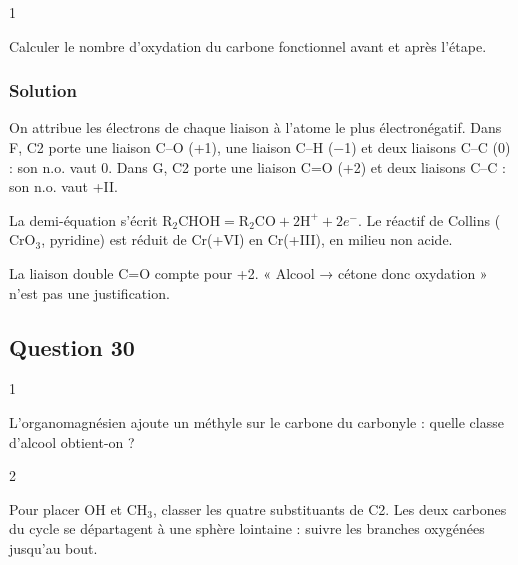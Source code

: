 \documentclass[11pt,a4paper]{article}
\newcommand{\equationajustee}[1]{%
  \sbox{\boiteequation}{$\displaystyle #1$}%
  \ifdim\wd\boiteequation>\linewidth
    \[\resizebox{\linewidth}{!}{\usebox{\boiteequation}}\]%
  \else
    \[#1\]%
  \fi}
\begin{document}
\begin{indication}{1}

Calculer le nombre d'oxydation du carbone fonctionnel avant et après l'étape.

\end{indication}

\hypertarget{solution-28}{%
\subsubsection{Solution}\label{solution-28}}

On attribue les électrons de chaque liaison à l'atome le plus électronégatif. Dans F, C2 porte une liaison C--O (+1), une liaison C--H (−1) et deux liaisons C--C (0) : son n.o. vaut 0. Dans G, C2 porte une liaison C=O (+2) et deux liaisons C--C : son n.o. vaut +II.

\equationajustee{\boxed{\Delta\text{n.o.}=+2 : \text{oxydation}}}

La demi-équation s'écrit \(\mathrm{R_2CHOH}=\mathrm{R_2CO}+2\mathrm{H^+}+2e^-\). Le réactif de Collins (\(\mathrm{CrO_3}\), pyridine) est réduit de Cr(+VI) en Cr(+III), en milieu non acide.

\begin{piege}

La liaison double C=O compte pour +2. « Alcool → cétone donc oxydation » n'est pas une justification.

\end{piege}

\hypertarget{question-30}{%
\subsection{Question 30}\label{question-30}}

\begin{indication}{1}

L'organomagnésien ajoute un méthyle sur le carbone du carbonyle : quelle classe d'alcool obtient-on ?

\end{indication}

\begin{indication}{2}

Pour placer OH et \(\mathrm{CH_3}\), classer les quatre substituants de C2. Les deux carbones du cycle se départagent à une sphère lointaine : suivre les branches oxygénées jusqu'au bout.

\end{indication}
\end{document}

